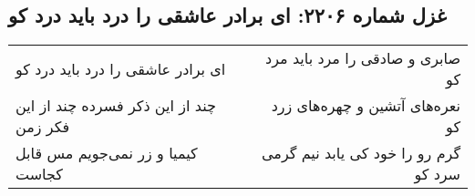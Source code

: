 \begin{center}
\section*{غزل شماره ۲۲۰۶: ای برادر عاشقی را درد باید درد کو}
\label{sec:2206}
\begin{longtable}{l p{0.5cm} r}
ای برادر عاشقی را درد باید درد کو
&&
صابری و صادقی را مرد باید مرد کو
\\
چند از این ذکر فسرده چند از این فکر زمن
&&
نعره‌های آتشین و چهره‌های زرد کو
\\
کیمیا و زر نمی‌جویم مس قابل کجاست
&&
گرم رو را خود کی یابد نیم گرمی سرد کو
\\
\end{longtable}
\end{center}
